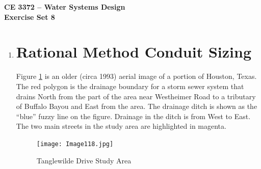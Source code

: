 \documentclass[12pt]{article}
\begin{document}
\begin{center}
{\textbf{{ CE 3372 -- Water Systems Design} \\ {Exercise Set 8}}}
\end{center}

\begin{enumerate}
\item \section*{\small{Rational Method Conduit Sizing}}
Figure \ref{fig:aerial} is an older (circa 1993) aerial image of a portion of Houston, Texas.   
The red polygon is the drainage boundary for a storm sewer system that drains North from the part of the area near Westheimer Road to a tributary of Buffalo Bayou and East from the area.
The drainage ditch is shown as the ``blue''   fuzzy line on the figure.  
Drainage in the ditch is from West to East.
The two main streets in the study area are highlighted in magenta.  
\begin{figure}[h!] %
   \centering
   \texttt{[image: Image118.jpg]} 
   \caption{Tanglewilde Drive Study Area}
   \label{fig:aerial}
\end{figure}
\clearpage


\end{enumerate}
\end{document}

